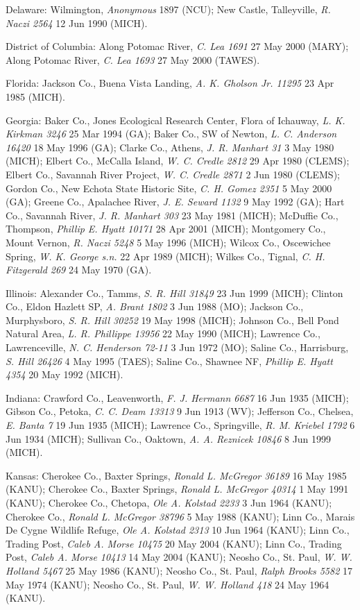 \documentclass{article}
\begin{document}
Delaware:
Wilmington, \textit{Anonymous}	1897 (NCU);
New Castle, Talleyville, \textit{R. Naczi 2564}	12 Jun 1990 (MICH).

District of Columbia:
Along Potomac River, \textit{C. Lea 1691} 27 May 2000 (MARY);
Along Potomac River, \textit{C. Lea 1693} 27 May 2000 (TAWES).

Florida:
Jackson Co., Buena Vista Landing, \textit{A. K. Gholson Jr. 11295} 23 Apr 1985 (MICH).

Georgia:
Baker Co., Jones Ecological Research Center, Flora of Ichauway, \textit{L. K. Kirkman 3246} 25 Mar 1994 (GA);
Baker Co., SW of Newton, \textit{L. C. Anderson 16420} 18 May 1996 (GA);
Clarke Co., Athens, \textit{J. R. Manhart 31} 3 May 1980 (MICH);
Elbert Co., McCalla Island, \textit{W. C. Credle 2812} 29 Apr 1980 (CLEMS);
Elbert Co., Savannah River Project, \textit{W. C. Credle 2871} 2 Jun 1980 (CLEMS);
Gordon Co., New Echota State Historic Site, \textit{C. H. Gomez 2351} 5 May 2000 (GA);
Greene Co., Apalachee River, \textit{J. E. Seward 1132} 9 May 1992 (GA);
Hart Co., Savannah River, \textit{J. R. Manhart 303} 23 May 1981 (MICH);
McDuffie Co., Thompson, \textit{Phillip E. Hyatt 10171} 28 Apr 2001 (MICH);
Montgomery Co., Mount Vernon, \textit{R. Naczi 5248} 5 May 1996 (MICH);
Wilcox Co., Oscewichee Spring, \textit{W. K. George s.n.} 22 Apr 1989 (MICH);
Wilkes Co., Tignal, \textit{C. H. Fitzgerald 269} 24 May 1970 (GA).

Illinois:
Alexander Co., Tamms, \textit{S. R. Hill 31849} 23 Jun 1999 (MICH);
Clinton Co., Eldon Hazlett SP, \textit{A. Brant 1802} 3 Jun 1988 (MO);
Jackson Co., Murphysboro, \textit{S. R. Hill 30252} 19 May 1998 (MICH);
Johnson Co., Bell Pond Natural Area, \textit{L. R. Phillippe 13956} 22 May 1990 (MICH);
Lawrence Co., Lawrenceville, \textit{N. C. Henderson 72-11} 3 Jun 1972 (MO);
Saline Co., Harrisburg, \textit{S. Hill 26426} 4 May 1995 (TAES);
Saline Co., Shawnee NF, \textit{Phillip E. Hyatt 4354} 20 May 1992 (MICH).

Indiana:
Crawford Co., Leavenworth, \textit{F. J. Hermann 6687} 16 Jun 1935 (MICH);
Gibson Co., Petoka, \textit{C. C. Deam 13313} 9 Jun 1913 (WV);
Jefferson Co., Chelsea, \textit{E. Banta 7} 19 Jun 1935 (MICH);
Lawrence Co., Springville, \textit{R. M. Kriebel 1792} 6 Jun 1934 (MICH);
Sullivan Co., Oaktown, \textit{A. A. Reznicek 10846} 8 Jun 1999 (MICH).

Kansas:
Cherokee Co., Baxter Springs, \textit{Ronald L. McGregor 36189} 16 May 1985 (KANU);
Cherokee Co., Baxter Springs, \textit{Ronald L. McGregor 40314} 1 May 1991 (KANU);
Cherokee Co., Chetopa, \textit{Ole A. Kolstad 2233} 3 Jun 1964 (KANU);
Cherokee Co., \textit{Ronald L. McGregor 38796} 5 May 1988 (KANU);
Linn Co., Marais De Cygne Wildlife Refuge, \textit{Ole A. Kolstad 2313} 10 Jun 1964 (KANU);
Linn Co., Trading Post, \textit{Caleb A. Morse 10475} 20 May 2004 (KANU);
Linn Co., Trading Post, \textit{Caleb A. Morse 10413} 14 May 2004 (KANU);
Neosho Co., St. Paul, \textit{W. W. Holland 5467} 25 May 1986 (KANU);
Neosho Co., St. Paul, \textit{Ralph Brooks 5582} 17 May 1974 (KANU);
Neosho Co., St. Paul, \textit{W. W. Holland 418} 24 May 1964 (KANU).
\end{document}
